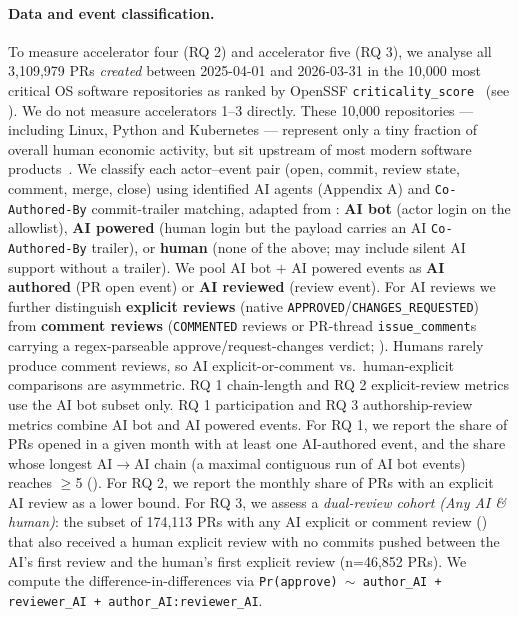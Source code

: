 \documentclass{article}
\begin{document}
\paragraph{Data and event classification.} To measure accelerator four (RQ 2) and accelerator five (RQ 3), we analyse all 3,109,979{} PRs \emph{created} between 2025-04-01 and 2026-03-31 in the 10,000{} most critical OS software repositories as ranked by OpenSSF \texttt{criticality\_score}~\citep{ossf-criticality} (see ). We do not measure accelerators 1--3 directly. These 10,000{} repositories --- including Linux, Python and Kubernetes --- represent only a tiny fraction of overall human economic activity, but sit upstream of most modern software products~\citep{glasswing2026}. We classify each actor--event pair (open, commit, review state, comment, merge, close) using identified AI agents (Appendix A) and \texttt{Co-Authored-By} commit-trailer matching, adapted from \citet{ghaleb2026fingerprinting}: \textbf{AI bot} (actor login on the allowlist), \textbf{AI powered} (human login but the payload carries an AI \texttt{Co-Authored-By} trailer), or \textbf{human} (none of the above; may include silent AI support without a trailer). We pool AI bot $+$ AI powered events as \textbf{AI authored} (PR open event) or \textbf{AI reviewed} (review event). For AI reviews we further distinguish \textbf{explicit reviews} (native \texttt{APPROVED}/\texttt{CHANGES\_REQUESTED}) from \textbf{comment reviews} (\texttt{COMMENTED} reviews or PR-thread \texttt{issue\_comment}s carrying a regex-parseable approve/request-changes verdict; ). Humans rarely produce comment reviews, so AI explicit-or-comment vs.\ human-explicit comparisons are asymmetric. RQ 1 chain-length and RQ 2 explicit-review metrics use the AI bot subset only. RQ 1 participation and RQ 3 authorship-review metrics combine AI bot and AI powered events.
For RQ 1, we report the share of PRs opened in a given month with at least one AI-authored event, and the share whose longest AI$\to$AI chain (a maximal contiguous run of AI bot events) reaches $\geq$5 (). For RQ 2, we report the monthly share of PRs with an explicit AI review as a lower bound. For RQ 3, we assess a \emph{dual-review cohort (Any AI \& human)}: the subset of 174,113{} PRs with any AI explicit or comment review () that also received a human explicit review with no commits pushed between the AI's first review and the human's first explicit review (n=46,852{} PRs). We compute the difference-in-differences via \texttt{Pr(approve) $\sim$ author\_AI + reviewer\_AI + author\_AI:reviewer\_AI}.
\end{document}
